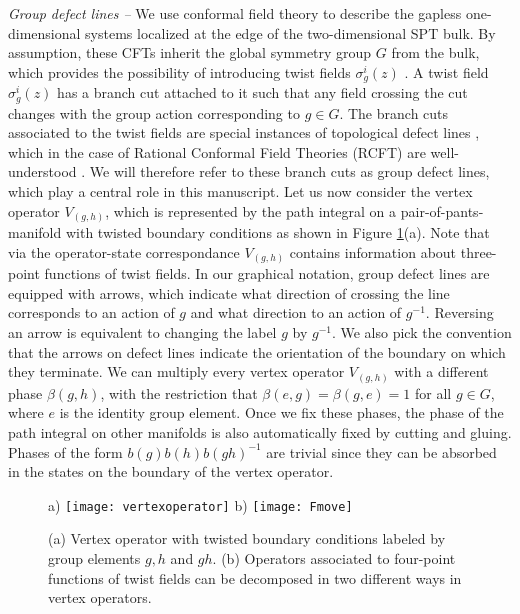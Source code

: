 \documentclass[aps,pra,twocolumn,superscriptaddress,10pt,article,nofootinbib,showpacs]{revtex4-1}
\begin{document}
\emph{Group defect lines -- } We use conformal field theory to describe the gapless one-dimensional systems localized at the edge of the two-dimensional SPT bulk. By assumption, these CFTs inherit the global symmetry group $G$ from the bulk, which provides the possibility of introducing twist fields $\sigma^i_g(z)$ \cite{DixonFriedan}. A twist field $\sigma^i_g(z)$ has a branch cut attached to it such that any field crossing the cut changes with the group action corresponding to $g\in G$. The branch cuts associated to the twist fields are special instances of topological defect lines \cite{Oshikawa,Petkova,Bachas}, which in the case of Rational Conformal Field Theories (RCFT) are well-understood \cite{FrohlichFuchs2,FuchsGaberdiel}. We will therefore refer to these branch cuts as group defect lines, which play a central role in this manuscript. Let us now consider the vertex operator $V_{(g,h)}$, which is represented by the path integral on a pair-of-pants-manifold with twisted boundary conditions as shown in Figure \ref{fig:vertex}(a). Note that via the operator-state correspondance $V_{(g,h)}$ contains information about three-point functions of twist fields. In our graphical notation, group defect lines are equipped with arrows, which indicate what direction of crossing the line corresponds to an action of $g$ and what direction to an action of $g^{-1}$. Reversing an arrow is equivalent to changing the label $g$ by $g^{-1}$. We also pick the convention that the arrows on defect lines indicate the orientation of the boundary on which they terminate. We can multiply every vertex operator $V_{(g,h)}$ with a different phase $\beta(g,h)$, with the restriction that $\beta(e,g)=\beta(g,e)=1$ for all $g \in G$, where $e$ is the identity group element. Once we fix these phases, the phase of the path integral on other manifolds is also automatically fixed by cutting and gluing. Phases of the form $b(g)b(h)b(gh)^{-1}$ are trivial since they can be absorbed in the states on the boundary of the vertex operator. 

\begin{figure}[t]
a)
\texttt{[image: vertexoperator]}\hspace{4 mm} b)
\texttt{[image: Fmove]}
\caption{(a) Vertex operator with twisted boundary conditions labeled by group elements $g,h$ and $gh$. (b) Operators associated to four-point functions of twist fields can be decomposed in two different ways in vertex operators.}\label{fig:vertex}
\end{figure}
\end{document}
